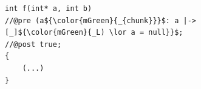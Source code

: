 \documentclass{beamer}
\begin{document}
\begin{frame}[fragile]
\begin{columns}
\begin{column}{0.08\textwidth}
\end{column}

\begin{column}{0.56\textwidth}

\begin{figure}[h]
  \centering
\begin{lstlisting}[style=CStyleNoNum, captionpos = t,title = Source]
int f(int* a, int b)
//@pre (a${\color{mGreen}{_{chunk}}}$: a |-> [_]${\color{mGreen}{_L) \lor a = null}}$;
//@post true;
{
	(...)
}
\end{lstlisting}
\end{figure}   

\end{column}
\end{columns}

\end{frame}
\end{document}
